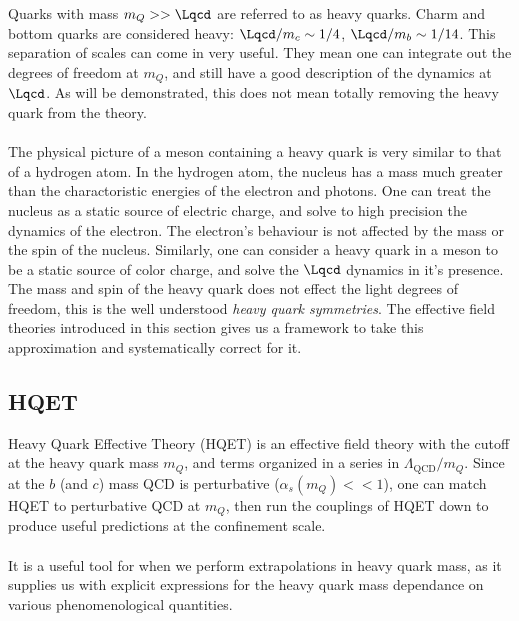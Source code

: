 Quarks with mass $m_Q >> \Lqcd$ are referred to as heavy quarks. Charm and bottom quarks are considered heavy: $\Lqcd/m_c \sim 1/4$, $\Lqcd/m_b \sim 1/14$. This separation of scales can come in very useful. They mean one can integrate out the degrees of freedom at $m_Q$, and still have a good description of the dynamics at $\Lqcd$. As will be demonstrated, this does not mean totally removing the heavy quark from the theory.
\\ \\
The physical picture of a meson containing a heavy quark is very similar to that of a hydrogen atom. In the hydrogen atom, the nucleus has a mass much greater than the charactoristic energies of the electron and photons. One can treat the nucleus as a static source of electric charge, and solve to high precision the dynamics of the electron. The electron's behaviour is not affected by the mass or the spin of the nucleus. Similarly, one can consider a heavy quark in a meson to be a static source of color charge, and solve the $\Lqcd$ dynamics in it's presence. The mass and spin of the heavy quark does not effect the light degrees of freedom, this is the well understood {\it{heavy quark symmetries}}. The effective field theories introduced in this section gives us a framework to take this approximation and systematically correct for it.

\subsection{HQET}

{}

Heavy Quark Effective Theory (HQET) is an effective field theory with the cutoff at the heavy quark mass $m_Q$, and terms organized in a series in $\Lambda_{\text{QCD}}/m_Q$. Since at the $b$ (and $c$) mass QCD is perturbative ($\alpha_s(m_Q) << 1$), one can match HQET to perturbative QCD at $m_Q$, then run the couplings of HQET down to produce useful predictions at the confinement scale.
\\ \\
It is a useful tool for when we perform extrapolations in heavy quark mass, as it supplies us with explicit expressions for the heavy quark mass dependance on various phenomenological quantities.

